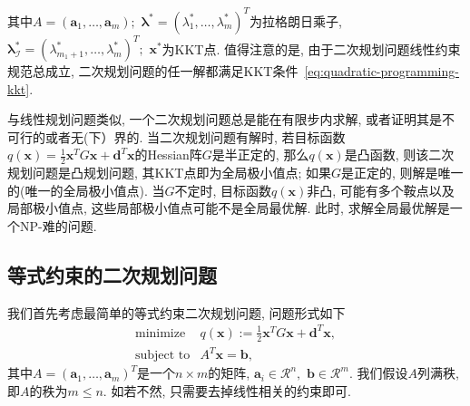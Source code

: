 \documentclass{SBCbookchapter}
\newcommand{\V}[1]{{\bm{#1}}}
\newcommand{\R}{\mathcal{R}}
\numberwithin{equation}{section}
\begin{document}
其中$A = (\V{a}_1, \ldots, \V{a}_m);$ $\V{\lambda}^* = (\lambda_1^*, \ldots, \lambda_m^*)^T$为拉格朗日乘子, $\V{\lambda}^*_{\mathcal{I}} = (\lambda_{m_1+1}^*, \ldots, \lambda_m^*)^T;$ $\V{x}^*$为KKT点. 值得注意的是, 由于二次规划问题线性约束规范总成立, 二次规划问题的任一解都满足KKT条件~\eqref{eq:quadratic-programming-kkt}.

与线性规划问题类似, 一个二次规划问题总是能在有限步内求解, 或者证明其是不可行的或者无(下）界的. 当二次规划问题有解时, 若目标函数$q(\V{x}) = \frac{1}{2} \V{x}^T G \V{x} + \V{d}^T \V{x}$的Hessian阵$G$是半正定的, 那么$q(\V{x})$是凸函数, 则该二次规划问题是凸规划问题, 其KKT点即为全局极小值点; 如果$G$是正定的, 则解是唯一的(唯一的全局极小值点). 当$G$不定时, 目标函数$q(\V{x})$非凸, 可能有多个鞍点以及局部极小值点, 这些局部极小值点可能不是全局最优解. 此时, 求解全局最优解是一个NP-难的问题\cite{Murty_1987}.


\subsection{等式约束的二次规划问题}
\label{subsec:7.2.1}

我们首先考虑最简单的等式约束二次规划问题, 问题形式如下
\begin{equation}
\label{eq:quadratic-programming-eq-constrained}
\begin{array}{cl}
\text{minimize} & q(\V{x}) := \frac{1}{2} \V{x}^T G \V{x} + \V{d}^T \V{x}, \\
\text{subject to} & A^T \V{x} = \V{b},
\end{array}
\end{equation}
其中$A = (\V{a}_1, \ldots, \V{a}_m)^T$是一个$n \times m$的矩阵, $\V{a}_i \in \R^n,$ $\V{b} \in \R^m.$ 我们假设$A$列满秩, 即$A$的秩为$m \leqslant n.$ 如若不然, 只需要去掉线性相关的约束即可.
\end{document}
